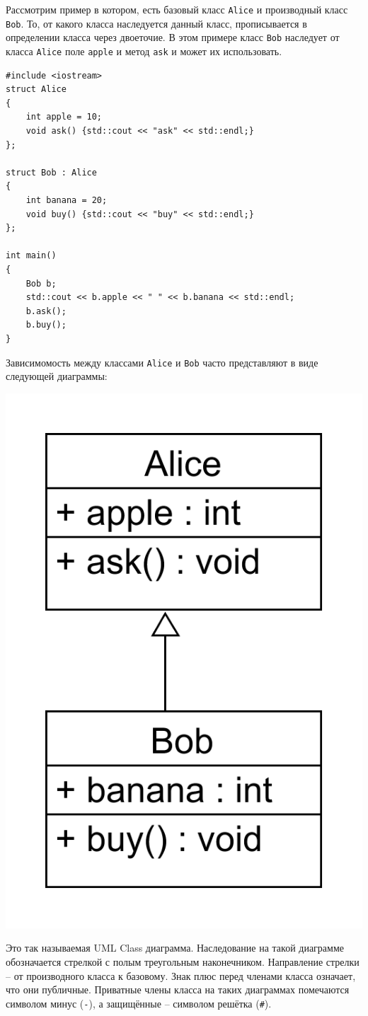 \documentclass{article}
\begin{document}
Рассмотрим пример в котором, есть базовый класс \texttt{Alice} и производный класс \texttt{Bob}. То, от какого класса наследуется данный класс, прописывается в определении класса через двоеточие. В этом примере класс \texttt{Bob} наследует от класса \texttt{Alice} поле \texttt{apple} и метод \texttt{ask} и может их использовать.
\begin{lstlisting}
#include <iostream>
struct Alice
{
    int apple = 10;
    void ask() {std::cout << "ask" << std::endl;}
};

struct Bob : Alice
{
    int banana = 20;
    void buy() {std::cout << "buy" << std::endl;}
};

int main()
{
    Bob b;
    std::cout << b.apple << " " << b.banana << std::endl;
    b.ask();
    b.buy();
}
\end{lstlisting}
Зависимомость между классами \texttt{Alice} и \texttt{Bob} часто представляют в виде следующей диаграммы:
\begin{center}
\includegraphics[scale=0.18]{../images/alice_bob.png}
\end{center}
Это так называемая UML Class диаграмма. Наследование на такой диаграмме обозначается стрелкой с полым треугольным наконечником. Направление стрелки -- от производного класса к базовому. Знак плюс перед членами класса означает, что они публичные. Приватные члены класса на таких диаграммах помечаются символом минус (\texttt{-}), а защищённые -- символом решётка (\texttt{\#}).
\end{document}
